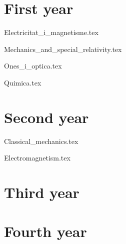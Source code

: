 \documentclass{report}
\begin{document}
    \chapter{First year}
        {Electricitat_i_magnetisme.tex}
        \cleardoublepage
        
        {Mechanics_and_special_relativity.tex}
        \cleardoublepage
        
        {Ones_i_optica.tex}
        \cleardoublepage
        
        {Quimica.tex}
        \cleardoublepage
    \chapter{Second year}
        {Classical_mechanics.tex}
        \cleardoublepage
        
        {Electromagnetism.tex}
        \cleardoublepage
    \chapter{Third year}
    \chapter{Fourth year}
\end{document}
